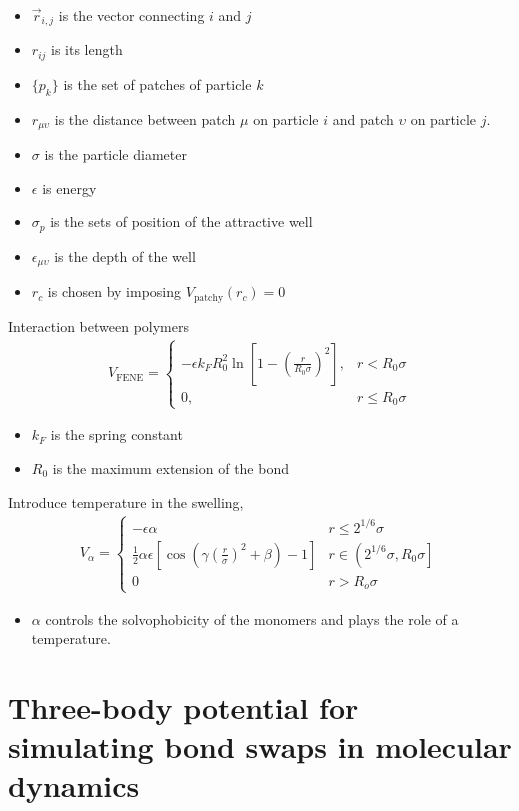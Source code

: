 \documentclass[main.tex]{subfiles}
\begin{document}
\begin{itemize}
	\item $\vec{r}_{i,j}$ is the vector connecting $i$ and $j$
	\item $r_{ij}$ is its length
	\item $\{p_k\}$ is the set of patches of particle $k$
	\item $r_{\mu\upsilon}$ is the distance between patch $\mu$ on particle $i$ and patch $\upsilon$ on particle $j$.
	\item $\sigma$ is the particle diameter
	\item $\epsilon$ is energy
	\item $\sigma_p$ is the sets of position of the attractive well
	\item $\epsilon_{\mu\upsilon}$ is the depth of the well
	\item $r_c$ is chosen by imposing $V_{\mathrm{patchy}}(r_c)=0$
\end{itemize}


Interaction between polymers
\begin{gather}
	V_{\mathrm{FENE}} = \left\{
	\begin{array}{cc}
		-\epsilon k_F R_0^2\ln\left[1-\left(\frac{r}{R_0\sigma}\right)^2\right], & r<R_0\sigma \\
		0, & r\leq R_0\sigma
	\end{array}
	\right.
\end{gather}

\begin{itemize}
	\item $k_F$ is the spring constant
	\item $R_0$ is the maximum extension of the bond
\end{itemize}

Introduce temperature in the swelling,
\begin{gather}
	V_\alpha = \left\{
	\begin{array}{ll}
		-\epsilon\alpha & r\leq2^{1/6}\sigma \\
		\frac{1}{2}\alpha\epsilon\left[\cos\left(\gamma\left(\frac{r}{\sigma}\right)^2 +\beta\right)-1\right] & r\in\left(2^{1/6}\sigma,R_0\sigma\right] \\
		0 & r>R_o\sigma
	\end{array}
	\right.
\end{gather}

\begin{itemize}
	\item $\alpha$ controls the solvophobicity of the monomers and plays the role of a temperature.
\end{itemize}


\section{Three-body potential for simulating bond swaps in molecular dynamics\citet{sciortinoThreebodyPotentialSimulating2017}}


\end{document}
